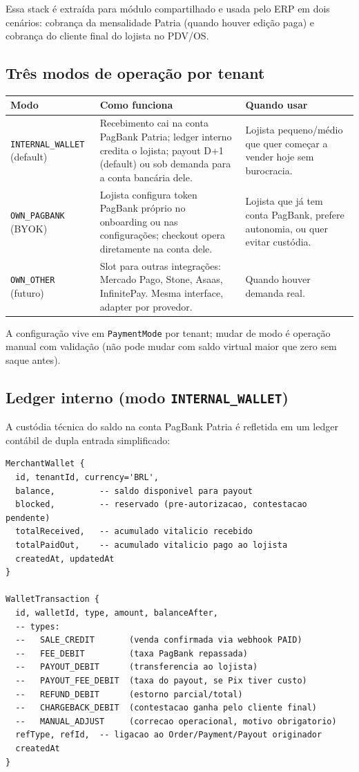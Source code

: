 \documentclass[11pt,a4paper]{article}
\begin{document}
Essa stack é extraída para módulo compartilhado e usada pelo ERP em dois
cenários: cobrança da mensalidade Patria (quando houver edição paga) e
cobrança do cliente final do lojista no PDV/OS.

\subsection{Três modos de operação por tenant}

\begin{longtable}{@{}p{3.5cm}p{5.5cm}p{5.5cm}@{}}
\toprule
\textbf{Modo} & \textbf{Como funciona} & \textbf{Quando usar} \\
\midrule
\endhead
\texttt{INTERNAL\_WALLET} (default) & Recebimento cai na conta PagBank
Patria; ledger interno credita o lojista; payout D+1 (default) ou sob
demanda para a conta bancária dele. & Lojista pequeno/médio que quer
começar a vender hoje sem burocracia. \\
\addlinespace
\texttt{OWN\_PAGBANK} (BYOK) & Lojista configura token PagBank próprio
no onboarding ou nas configurações; checkout opera diretamente na conta
dele. & Lojista que já tem conta PagBank, prefere autonomia, ou quer
evitar custódia. \\
\addlinespace
\texttt{OWN\_OTHER} (futuro) & Slot para outras integrações: Mercado Pago,
Stone, Asaas, InfinitePay. Mesma interface, adapter por provedor. & Quando
houver demanda real. \\
\bottomrule
\end{longtable}

A configuração vive em \texttt{PaymentMode} por tenant; mudar de modo é
operação manual com validação (não pode mudar com saldo virtual maior
que zero sem saque antes).

\subsection{Ledger interno (modo \texttt{INTERNAL\_WALLET})}

A custódia técnica do saldo na conta PagBank Patria é refletida em um
ledger contábil de dupla entrada simplificado:

\begin{lstlisting}
MerchantWallet {
  id, tenantId, currency='BRL',
  balance,         -- saldo disponivel para payout
  blocked,         -- reservado (pre-autorizacao, contestacao pendente)
  totalReceived,   -- acumulado vitalicio recebido
  totalPaidOut,    -- acumulado vitalicio pago ao lojista
  createdAt, updatedAt
}

WalletTransaction {
  id, walletId, type, amount, balanceAfter,
  -- types:
  --   SALE_CREDIT       (venda confirmada via webhook PAID)
  --   FEE_DEBIT         (taxa PagBank repassada)
  --   PAYOUT_DEBIT      (transferencia ao lojista)
  --   PAYOUT_FEE_DEBIT  (taxa do payout, se Pix tiver custo)
  --   REFUND_DEBIT      (estorno parcial/total)
  --   CHARGEBACK_DEBIT  (contestacao ganha pelo cliente final)
  --   MANUAL_ADJUST     (correcao operacional, motivo obrigatorio)
  refType, refId,  -- ligacao ao Order/Payment/Payout originador
  createdAt
}
\end{lstlisting}
\end{document}
